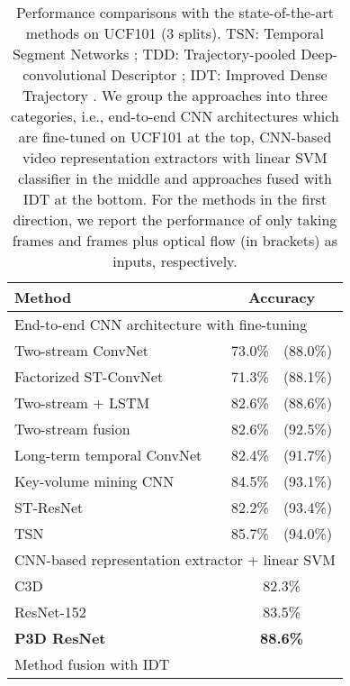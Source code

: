 \documentclass[10pt,twocolumn,letterpaper]{article}
\begin{document}
\begin{table}
\centering
\small
\caption{\small Performance comparisons with the state-of-the-art methods on UCF101 (3 splits). TSN: Temporal Segment Networks \cite{wang2016temporal}; TDD: Trajectory-pooled Deep-convolutional Descriptor \cite{wang2015action}; IDT: Improved Dense Trajectory \cite{wang2013action}. We group the approaches into three categories, i.e., end-to-end CNN architectures which are fine-tuned on UCF101 at the top, CNN-based video representation extractors with linear SVM classifier in the middle and approaches fused with IDT at the bottom. For the methods in the first direction, we report the performance of only taking frames and frames plus optical flow (in brackets) as inputs, respectively.}
\begin{tabular}{l|c} \hline
\textbf{Method}                                             & \textbf{Accuracy} \\ \hline
\multicolumn{2}{l}{End-to-end CNN architecture with fine-tuning} \\ \hline
Two-stream ConvNet \cite{simonyan2014two}                   & 73.0\%~~(88.0\%) \\
Factorized ST-ConvNet \cite{sun2015human}                   & 71.3\%~~(88.1\%) \\
Two-stream + LSTM \cite{yue2015beyond}                      & 82.6\%~~(88.6\%) \\
Two-stream fusion \cite{feichtenhofer2016convolutional}     & 82.6\%~~(92.5\%) \\
Long-term temporal ConvNet \cite{varol2016long}             & 82.4\%~~(91.7\%) \\
Key-volume mining CNN \cite{zhu2016key}                     & 84.5\%~~(93.1\%) \\
ST-ResNet \cite{feichtenhofer2016spatiotemporal}            & 82.2\%~~(93.4\%) \\
TSN \cite{wang2016temporal}                                 & 85.7\%~~(94.0\%) \\ \hline
\multicolumn{2}{l}{CNN-based representation extractor + linear SVM} \\ \hline
C3D \cite{tran2015learning}                                 & 82.3\%          \\
ResNet-152                                                   & 83.5\%          \\
\textbf{P3D ResNet}                                      & \textbf{88.6\%}          \\ \hline
\multicolumn{2}{l}{Method fusion with IDT} \\ \hline

\end{tabular}
\end{table}
\end{document}
